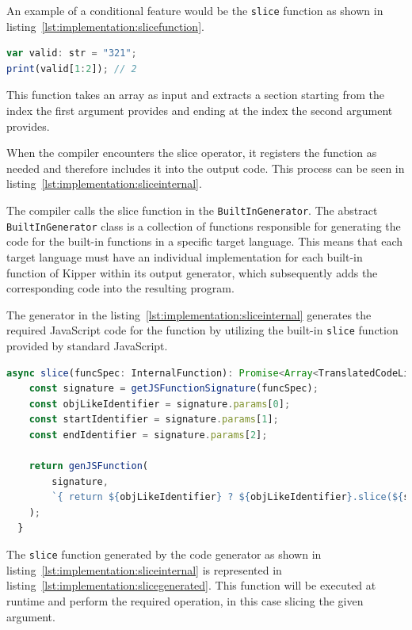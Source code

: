 An example of a conditional feature would be the \lstinline|slice| function as shown in listing~\ref{lst:implementation:slicefunction}. 

\begin{lstlisting}[language=TypeScript,caption=The Slice Operation,label=lst:implementation:slicefunction]
var valid: str = "321";
print(valid[1:2]); // 2
\end{lstlisting}

This function takes an array as input and extracts a section starting from the index the first argument provides and ending at the index the second argument provides.

When the compiler encounters the slice operator, it registers the function as needed and therefore includes it into the output code. This process can be seen in listing~\ref{lst:implementation:sliceinternal}. 

The compiler calls the slice function in the \lstinline|BuiltInGenerator|. The abstract \lstinline|BuiltInGenerator| class is a collection of functions responsible for generating the code for the built-in functions in a specific target language. This means that each target language must have an individual implementation for each built-in function of Kipper within its output generator, which subsequently adds the corresponding code into the resulting program.

The generator in the listing~\ref{lst:implementation:sliceinternal} generates the required JavaScript code for the function by utilizing the built-in \lstinline|slice| function provided by standard JavaScript.

\begin{lstlisting}[language=TypeScript,caption=Slice in the JavaScript BuiltInGenerator,label=lst:implementation:sliceinternal]
async slice(funcSpec: InternalFunction): Promise<Array<TranslatedCodeLine>> {
	const signature = getJSFunctionSignature(funcSpec);
	const objLikeIdentifier = signature.params[0];
	const startIdentifier = signature.params[1];
	const endIdentifier = signature.params[2];

	return genJSFunction(
		signature,
		`{ return ${objLikeIdentifier} ? ${objLikeIdentifier}.slice(${startIdentifier}, ${endIdentifier}) : ${objLikeIdentifier}; }`,
	);
  }
\end{lstlisting}

The \lstinline|slice| function generated by the code generator as shown in listing~\ref{lst:implementation:sliceinternal} is represented in listing~\ref{lst:implementation:slicegenerated}. This function will be executed at runtime and perform the required operation, in this case slicing the given argument.


